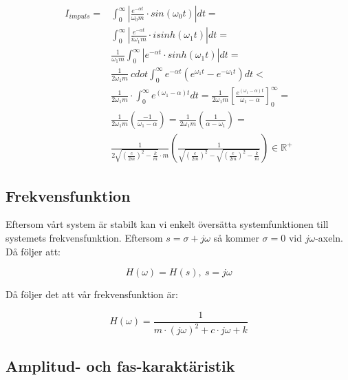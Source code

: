 \documentclass[10pt,a4paper]{article}
\begin{document}
\begin{itemize}
\begin{equation}
\begin{split}
I_{impuls}= & \int_{0}^{\infty}\left|\frac{e^{-\alpha t}}{\omega_0  m}\cdot sin(\omega_0 t)\right|dt=\\ & \int_{0}^{\infty}\left|\frac{e^{-\alpha t}}{i\omega_1 m}\cdot i sinh(\omega_1 t)\right|dt=\\ & \frac{1}{\omega_1  m}\int_{0}^{\infty}\left|e^{-\alpha t}\cdot sinh(\omega_1 t)\right|dt=\\ & \frac{1}{2 \omega_1  m} \ cdot \int_{0}^{\infty}e^{-\alpha t} \left( e^{\omega_1 t}-e^{-\omega_1 t} \right) dt< \\ & \frac{1}{2\omega_1  m} \cdot \int_{0}^{\infty}e^{(\omega_1-\alpha) t} dt=\frac{1}{2\omega_1  m}\left[\frac{e^{(\omega_1-\alpha) t}}{\omega_1-\alpha} \right]_{0}^{\infty}=\\ & \frac{1}{2\omega_1  m}\left(\frac{-1}{\omega_1-\alpha} \right)=\frac{1}{2\omega_1  m}\left(\frac{1}{\alpha-\omega_1} \right)=\\ & \frac{1}{2 \sqrt{\left(\frac{c}{2 m}\right)^2-\frac{k}{m}}   \cdot m}\left(\frac{1}{\sqrt{\left(\frac{c}{2 m}\right)^2}-\sqrt{\left(\frac{c}{2 m}\right)^2-\frac{k}{m}}} \right)\in \mathbb{R}^+
\end{split}
\end{equation}
\end{itemize}

\newpage

\subsection{Frekvensfunktion}
Eftersom vårt system är stabilt kan vi enkelt översätta systemfunktionen till systemets frekvensfunktion. Eftersom $s = \sigma + j\omega$ så kommer $\sigma = 0$ vid $j\omega$-axeln. Då följer att:

\begin{equation}
H(\omega) = H(s), \  s = j\omega
\end{equation}

Då följer det att vår frekvensfunktion är:

\begin{equation}
H(\omega) =  \frac{1}{m\cdot (j\omega)^2 + c \cdot j\omega + k}
\end{equation}


\subsection{Amplitud- och fas-karaktäristik}
\end{document}
